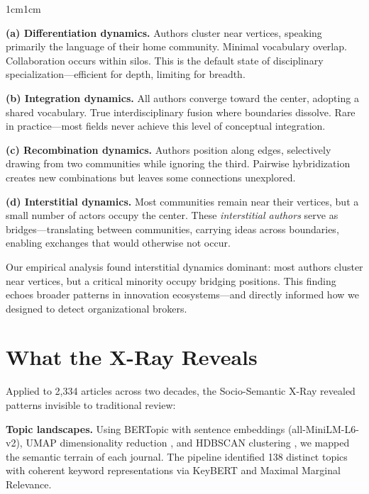 \documentclass[../main.tex]{subfiles}
\begin{document}
\begin{adjustwidth}{1cm}{1cm}

\noindent\textbf{(a) Differentiation dynamics.} Authors cluster near vertices, speaking primarily the language of their home community. Minimal vocabulary overlap. Collaboration occurs within silos. This is the default state of disciplinary specialization---efficient for depth, limiting for breadth.

\noindent\textbf{(b) Integration dynamics.} All authors converge toward the center, adopting a shared vocabulary. True interdisciplinary fusion where boundaries dissolve. Rare in practice---most fields never achieve this level of conceptual integration.

\noindent\textbf{(c) Recombination dynamics.} Authors position along edges, selectively drawing from two communities while ignoring the third. Pairwise hybridization creates new combinations but leaves some connections unexplored.

\noindent\textbf{(d) Interstitial dynamics.} Most communities remain near their vertices, but a small number of actors occupy the center. These \textit{interstitial authors} serve as bridges---translating between communities, carrying ideas across boundaries, enabling exchanges that would otherwise not occur.

Our empirical analysis found interstitial dynamics dominant: most authors cluster near vertices, but a critical minority occupy bridging positions. This finding echoes broader patterns in innovation ecosystems---and directly informed how we designed \RoleBox to detect organizational brokers.

\vspace{0.8cm}

\section*{What the X-Ray Reveals}

Applied to 2,334 articles across two decades, the Socio-Semantic X-Ray revealed patterns invisible to traditional review:


\noindent\textbf{Topic landscapes.} Using BERTopic \cite{grootendorst2022bertopic} with sentence embeddings (all-MiniLM-L6-v2), UMAP dimensionality reduction \cite{mcinnes2018umap}, and HDBSCAN clustering \cite{campello2013hdbscan}, we mapped the semantic terrain of each journal. The pipeline identified 138 distinct topics with coherent keyword representations via KeyBERT and Maximal Marginal Relevance.


\end{adjustwidth}
\end{document}

